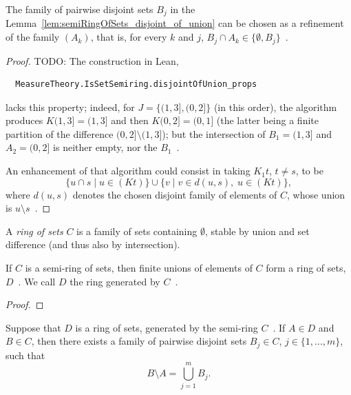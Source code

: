 \begin{lemma}\label{lem:semiRingOfSets_disjoint_of_union_finer}
  The family of pairwise disjoint sets $B_j$
  in the Lemma~\ref{lem:semiRingOfSets_disjoint_of_union}
  can be chosen
  as a refinement of the family $(A_k)$, that is,
  for every $k$ and $j$,
  $B_j \cap A_k \in \{\emptyset, B_j\}$~.
\end{lemma}

\begin{proof}
  TODO: The construction in Lean,
\begin{verbatim}
  MeasureTheory.IsSetSemiring.disjointOfUnion_props
\end{verbatim}
  lacks this property; indeed, for $J = \{ (1,3], (0,2] \}$ (in this order),
  the algorithm produces $K (1,3] = (1,3]$ and then $K (0,2] = (0,1]$
  (the latter being a finite partition of the difference $(0,2]\setminus(1,3]$);
  but the intersection of $B_1=(1,3]$ and $A_2=(0,2]$ is neither empty, nor the $B_1$~.

  An enhancement of that algorithm could consist in taking $K_1 t$, $t\neq s$,
  to be
  \[
  \{ u\cap s \mid u\in (K t)\}
  \cup
  \{ v \mid v\in d(u,s),\; u\in (K t)\},
  \]
  where $d(u,s)$ denotes the chosen disjoint family of elements of $C$, whose union
  is $u\setminus s$~.
\end{proof}

\begin{definition}\label{def:ringOfSets}
  \mathlibok
  A \emph{ring of sets} $C$ is a family of sets containing $\emptyset$,
  stable by union and set difference (and thus also by intersection).
\end{definition}

\begin{lemma}\label{lem:setRing_of_finiteUnions}
  \mathlibok
  If $C$ is a semi-ring of sets,
  then finite unions of elements of $C$ form a ring of sets, $D$~.
  We call $D$ the ring generated by $C$~.
\end{lemma}

\begin{proof}
  \leanok
\end{proof}

\begin{corollary}\label{cor:semiRingOfSets_subtract_ringElem}
  Suppose that $D$ is a ring of sets, generated by the semi-ring $C$~.
  If $A\in D$ and $B\in C$, then
  there exists a family of pairwise disjoint sets $B_j \in C$, $j \in \{1, ..., m\}$,
  such that
  \[
    B\setminus A = \bigcup_{j=1}^m B_j.
  \]
\end{corollary}

